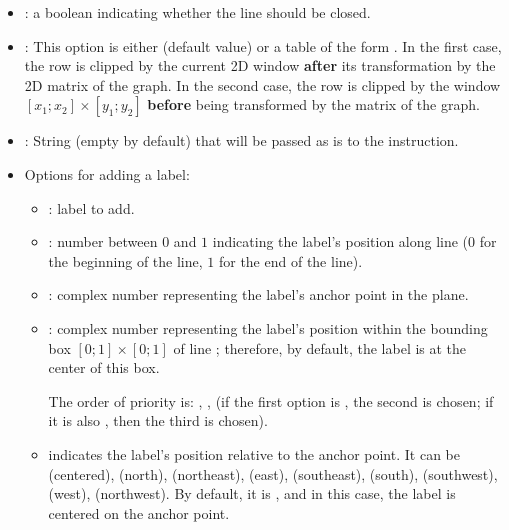 \begin{itemize}
    \item {}: a boolean indicating whether the line  should be closed.

    \item {}: This option is either \nil (default value) or a table of the form . In the first case, the row is clipped by the current 2D window \textbf{after} its transformation by the 2D matrix of the graph. In the second case, the row is clipped by the window $[x_1;x_2]\times[y_1;y_2]$ \textbf{before} being transformed by the matrix of the graph.

    \item {}: String (empty by default) that will be passed as is to the \drawcmd instruction.
    
    \item Options for adding a label:\label{dec:dpolyline}
    \begin{itemize}
        \item {}: label to add.
        
        \item {}: number between $0$ and $1$ indicating the label's position along line  ($0$ for the beginning of the line, $1$ for the end of the line).
        
        \item {}: complex number representing the label's anchor point in the plane.

    \item {}: complex number representing the label's position within the bounding box $[0;1]\times[0;1]$ of line ; therefore, by default, the label is at the center of this box.

    The order of priority is: , ,  (if the first option is \nil, the second is chosen; if it is also \nil, then the third is chosen).

    \item {} indicates the label's position relative to the anchor point. It can be  (centered),  (north),  (northeast),  (east),  (southeast),  (south),  (southwest),  (west),  (northwest). By default, it is , and in this case, the label is centered on the anchor point.


\end{itemize}
\end{itemize}
